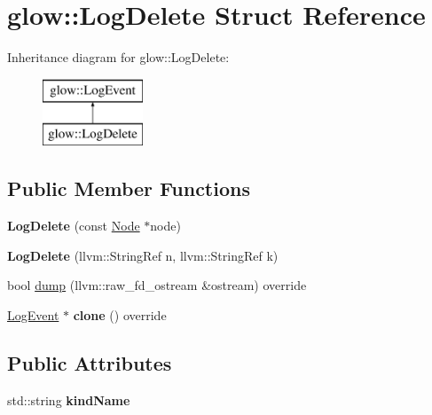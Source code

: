 \hypertarget{structglow_1_1_log_delete}{}\section{glow\+:\+:Log\+Delete Struct Reference}
\label{structglow_1_1_log_delete}
Inheritance diagram for glow\+:\+:Log\+Delete\+:\begin{figure}[H]
\begin{center}
\leavevmode
\includegraphics[height=2.000000cm]{structglow_1_1_log_delete}
\end{center}
\end{figure}
\subsection*{Public Member Functions}
\begin{DoxyCompactItemize}
\item 
\mbox{\label{structglow_1_1_log_delete_a5367d5d4a4e7889210e5afd19843402c}} 
{\bfseries Log\+Delete} (const \hyperlink{classglow_1_1_node}{Node} $\ast$node)
\item 
\mbox{\label{structglow_1_1_log_delete_a0f027774eef1946be9a6db38f8677215}} 
{\bfseries Log\+Delete} (llvm\+::\+String\+Ref n, llvm\+::\+String\+Ref k)
\item 
bool \hyperlink{structglow_1_1_log_delete_a8d29cdcc6351be77ac45d28fef52a3f9}{dump} (llvm\+::raw\+\_\+fd\+\_\+ostream \&ostream) override
\item 
\mbox{\label{structglow_1_1_log_delete_aa20ade7617e09dd08e68465233648263}} 
\hyperlink{structglow_1_1_log_event}{Log\+Event} $\ast$ {\bfseries clone} () override
\end{DoxyCompactItemize}
\subsection*{Public Attributes}
\begin{DoxyCompactItemize}
\item 
\mbox{\label{structglow_1_1_log_delete_a378d321a026f8cf9576526c02dda729c}} 
std\+::string {\bfseries kind\+Name}
\end{DoxyCompactItemize}


